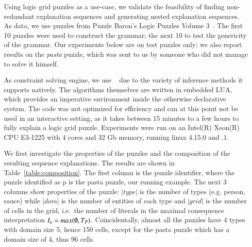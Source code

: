 Using logic grid puzzles as a use-case, we validate the feasibility of finding non-redundant explanation sequences and generating nested explanation sequences.
As data, we use puzzles from Puzzle Baron’s Logic Puzzles Volume 3~\cite{logigrammen}.
The first 10 puzzles were used to construct the grammar; the next 10 to test the genericity of the grammar.
Our experiments below are on test puzzles only; we also report results on the \textit{pasta} puzzle, which was sent to us by someone who did not manage to solve it himself.

As constraint solving engine, we use \idp~\cite{IDP} due to the variety of inference methods it supports natively.
The algorithms themselves are written in embedded LUA, which provides an imperative environment inside the otherwise declarative \idp system.
The code was not optimized for efficiency and can at this point not be used in an interactive setting, as it takes between 15 minutes to a few hours to fully explain a logic grid puzzle.
Experiments were run on an Intel(R) Xeon(R) CPU E3-1225 with 4 cores and 32 Gb memory, running linux 4.15.0 and .1.








We first investigate the properties of the puzzles and the composition of the resulting sequence explanations. The results are shown in Table~\ref{table:composition}. The first column is the puzzle identifier, where the puzzle identified as p is the pasta puzzle, our running example. 
The next 3 columns show properties of the puzzle:
$|type|$ is the number of types (e.g. person, sauce) while $|dom|$ is the number of entities of each type and $|grid|$ is the number of cells in the grid, i.e.\ the number of literals in the maximal consequence interpretation $I_n=max(\emptyset, T_P)$.
Coincidentally, almost all the puzzles have 4 types with domain size 5,  hence 150 cells, except for the pasta puzzle which has a domain size of 4, thus 96 cells.

